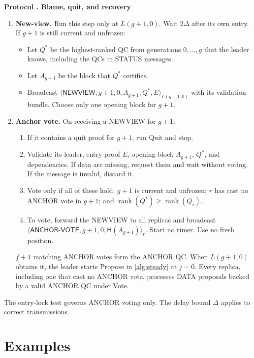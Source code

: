 \documentclass[11pt,a4paper]{article}
\newcommand{\RR}[1]{{\color{rrRed}#1}}
\newcommand{\Hash}{\mathsf H}
\newcommand{\rank}{\operatorname{rank}}
\newcommand{\tagg}[1]{\ensuremath{\mathsf{#1}}}
\newcounter{protocol}
\newenvironment{protocol}[2]{\refstepcounter{protocol}\label{#1}
\begin{mdframed}[nobreak=true,linewidth=.6pt,skipabove=8pt,skipbelow=8pt,
innertopmargin=7pt,innerbottommargin=7pt]\small
\textbf{Protocol \theprotocol. #2}\par\smallskip}{\end{mdframed}}
\begin{document}
\begin{protocol}{alg:recovery}{Blame, quit, and recovery}
\begin{enumerate}[label=\textbf{\arabic*)},itemsep=5pt]
\item \textbf{New-view.} Run this step only at $L(g+1,0)$. Wait $2\Delta$
after its own entry. If $g+1$ is still current and unfrozen:
 \begin{itemize}
 \item Let $Q^*$ be the highest-ranked QC from generations $0,\ldots,g$
       that the leader knows, including the QCs in STATUS
       messages.
 \item Let $A_{g+1}$ be the block that $Q^*$ certifies.
 \item Broadcast
       $\langle\tagg{NEWVIEW},g+1,0,A_{g+1},Q^*,E\rangle_{L(g+1,0)}$
       with its validation bundle. \RR{Choose only one opening block for
       $g+1$.}
 \end{itemize}

\item \textbf{Anchor vote.} On receiving a NEWVIEW for $g+1$:
 \begin{enumerate}[label=(\alph*)]
 \item \RR{If it contains a quit proof for $g+1$, run Quit and stop.}
 \item Validate its leader, entry proof $E$, opening block $A_{g+1}$,
       $Q^*$, and dependencies. If data are missing, request them and
       wait without voting. If the message is invalid, discard it.
 \item Vote only if all of these hold: $g+1$ is current and unfrozen; $r$
       has cast no ANCHOR vote in $g+1$; and $\rank(Q^*)\ge\rank(Q_r)$.
 \item To vote, forward the NEWVIEW to all replicas and broadcast
       $\langle\tagg{ANCHOR\mbox{-}VOTE},g+1,0,\Hash(A_{g+1})\rangle_r$.
       \RR{Start no timer. Use no fresh position.}
 \end{enumerate}
 $f+1$ matching ANCHOR votes form the ANCHOR QC. When $L(g+1,0)$
 obtains it, the leader starts Propose \RR{in \cref{alg:steady} at
 $j=0$}. Every replica, including one that cast no ANCHOR vote,
 processes DATA proposals backed by a valid ANCHOR QC under Vote.
\end{enumerate}
\end{protocol}

The entry-lock test governs ANCHOR voting only.
The delay bound $\Delta$ applies to correct transmissions.


\clearpage 


\section{Examples}
\label{sec:examples}
\end{document}
